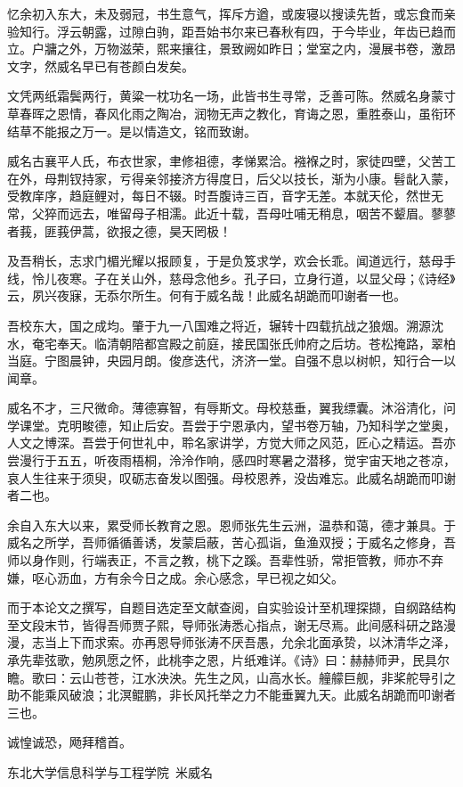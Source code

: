 \begin{acknowledgement}
忆余初入东大，未及弱冠，书生意气，挥斥方遒，或废寝以搜读先哲，或忘食而亲验知行。浮云朝露，过隙白驹，距吾始书尔来已春秋有四，于今毕业，年齿已趋而立。户牅之外，万物滋荣，熙来攘往，景致阙如昨日；堂室之内，漫展书卷，激昂文字，然威名早已有苍颜白发矣。

文凭两纸霜鬓两行，黄粱一枕功名一场，此皆书生寻常，乏善可陈。然威名身蒙寸草春晖之恩情，春风化雨之陶冶，润物无声之教化，育诲之恩，重胜泰山，虽衔环结草不能报之万一。是以情造文，铭而致谢。

威名古襄平人氏，布衣世家，聿修祖德，孝悌累洽。襁褓之时，家徒四壁，父苦工在外，母荆钗持家，亏得亲邻接济方得度日，后父以技长，渐为小康。髫龀入蒙，受教庠序，趋庭鲤对，每日不辍。时吾腹诗三百，音字无差。本就天伦，然世无常，父猝而远去，唯留母子相濡。此近十载，吾母吐哺无稍息，咽苦不颦眉。蓼蓼者莪，匪莪伊蒿，欲报之德，昊天罔极！

及吾稍长，志求门楣光耀以报顾复，于是负笈求学，欢会长乖。闻道远行，慈母手线，怜儿夜寒。子在关山外，慈母念他乡。孔子曰，立身行道，以显父母；《诗经》云，夙兴夜寐，无忝尔所生。何有于威名哉！此威名胡跪而叩谢者一也。

吾校东大，国之成均。肇于九一八国难之将近，辗转十四载抗战之狼烟。溯源沈水，奄宅奉天。临清朝陪都宫殿之前庭，接民国张氏帅府之后坊。苍松掩路，翠柏当庭。宁图晨钟，央园月朗。俊彦迭代，济济一堂。自强不息以树帜，知行合一以闻章。

威名不才，三尺微命。薄德寡智，有辱斯文。母校慈垂，翼我缥囊。沐浴清化，问学课堂。克明畯德，知止后安。吾尝于宁恩承内，望书卷万轴，乃知科学之堂奥，人文之博深。吾尝于何世礼中，聆名家讲学，方觉大师之风范，匠心之精运。吾亦尝漫行于五五，听夜雨梧桐，泠泠作响，感四时寒暑之潜移，觉宇宙天地之苍凉，哀人生往来于须臾，叹砺志奋发以图强。母校恩养，没齿难忘。此威名胡跪而叩谢者二也。

余自入东大以来，累受师长教育之恩。恩师张先生云洲，温恭和蔼，德才兼具。于威名之所学，吾师循循善诱，发蒙启蔽，苦心孤诣，鱼渔双授；于威名之修身，吾师以身作则，行端表正，不言之教，桃下之蹊。吾辈性骄，常拒管教，师亦不弃嫌，呕心沥血，方有余今日之成。余心感念，早已视之如父。

而于本论文之撰写，自题目选定至文献查阅，自实验设计至机理探撷，自纲路结构至文段末节，皆得吾师贾子熙，导师张涛悉心指点，谢无尽焉。此间感科研之路漫漫，志当上下而求索。亦再恩导师张涛不厌吾愚，允余北面承贽，以沐清华之泽，承先辈弦歌，勉夙愿之怀，此桃李之恩，片纸难详。《诗》曰：赫赫师尹，民具尔瞻。歌曰：云山苍苍，江水泱泱。先生之风，山高水长。艟艨巨舰，非桨舵导引之助不能乘风破浪；北溟鲲鹏，非长风托举之力不能垂翼九天。此威名胡跪而叩谢者三也。

诚惶诚恐，飏拜稽首。

\vfill
\begin{flushright}
  东北大学信息科学与工程学院\  米威名
\end{flushright}
\vfill




\end{acknowledgement}
